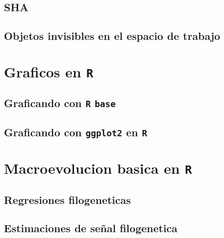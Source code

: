 \documentclass[
]{book}
\begin{document}
\hypertarget{sha}{%
\section{SHA}\label{sha}}

\hypertarget{objetos-invisibles-en-el-espacio-de-trabajo}{%
\section{Objetos invisibles en el espacio de trabajo}\label{objetos-invisibles-en-el-espacio-de-trabajo}}

\hypertarget{graficos-en-r}{%
\chapter{\texorpdfstring{Graficos en \texttt{R}}{Graficos en R}}\label{graficos-en-r}}

\hypertarget{graficando-con-r-base}{%
\section{\texorpdfstring{Graficando con \texttt{R} \texttt{base}}{Graficando con R base}}\label{graficando-con-r-base}}

\hypertarget{graficando-con-ggplot2-en-r}{%
\section{\texorpdfstring{Graficando con \texttt{ggplot2} en \texttt{R}}{Graficando con ggplot2 en R}}\label{graficando-con-ggplot2-en-r}}

\hypertarget{macroevolucion-basica-en-r-1}{%
\chapter{\texorpdfstring{Macroevolucion basica en \texttt{R}}{Macroevolucion basica en R}}\label{macroevolucion-basica-en-r-1}}

\hypertarget{regresiones-filogeneticas-1}{%
\section{Regresiones filogeneticas}\label{regresiones-filogeneticas-1}}

\hypertarget{estimaciones-de-seuxf1al-filogenetica-1}{%
\section{Estimaciones de señal filogenetica}\label{estimaciones-de-seuxf1al-filogenetica-1}}
\end{document}

